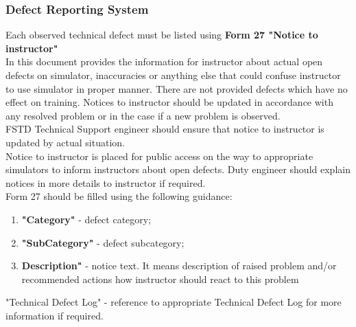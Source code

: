         \subsubsection{Defect Reporting System}
            Each observed technical defect must be listed using \textbf{Form 27 "Notice to instructor"} \\ 
            \vspace{3mm}
            In this document provides the information for instructor about actual open defects on simulator, inaccuracies or anything else that could 
            confuse instructor to use simulator in proper manner. There are not provided defects which have no effect on training. Notices to instructor 
            should be updated in accordance with any resolved problem or in the case if a new problem is observed. \\
            \vspace{3mm}
            FSTD Technical Support engineer should ensure that notice to instructor is updated by actual situation. \\ 
            \vspace{3mm}
            Notice to instructor is placed for public access on the way to appropriate simulators to inform instructors about open defects. Duty engineer 
            should explain notices in more details to instructor if required. \\
            \vspace{3mm}
            Form 27 should be filled using the following guidance:
            \begin{enumerate}
                \item \textbf{"Category"} - defect category;
                \item \textbf{"SubCategory"} - defect subcategory;
                \item \textbf{Description"} - notice text. It means description of raised problem and/or recommended actions how instructor should react 
                to this problem
            \end{enumerate}
            "Technical Defect Log" - reference to appropriate Technical Defect Log for more information if required.
